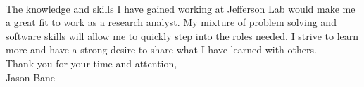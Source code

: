 \documentclass[12pt,letterpaper]{article}
\begin{document}
\paragraph{}The knowledge and skills I have gained working at Jefferson Lab would make me a great fit to work as a research analyst. My mixture of problem solving and software skills will allow me to quickly step into the roles needed. I strive to learn more and have a strong desire to share what I have learned with others. 
\\

\noindent Thank you for your time and attention,\\
\noindent Jason Bane
\end{document}
